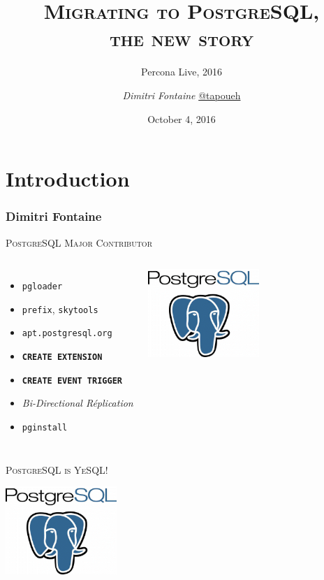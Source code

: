 \documentclass{beamer}
\title{\textsc{Migrating to PostgreSQL, \\ the new story}}
\subtitle{Percona Live, 2016}
\author{\textit{Dimitri Fontaine} \url{@tapoueh}}
\date{October 4, 2016}
\begin{document}
\frame{\titlepage}

\section{Introduction}

\begin{frame}[fragile]
  \frametitle{Dimitri Fontaine}

  \begin{center}
    {\Large \textsc{PostgreSQL Major Contributor}}
  \end{center}

  \begin{columns}[c]

    \begin{itemize}
    \item \texttt{pgloader}
    \item \texttt{prefix}, \texttt{skytools}
    \item \texttt{apt.postgresql.org}
    \item \texttt{\textbf{CREATE EXTENSION}}
    \item \texttt{\textbf{CREATE EVENT TRIGGER}}
    \item \textit{Bi-Directional Réplication}
    \item \texttt{pginstall}
    \end{itemize}  

    \begin{center}
      \includegraphics[height=9em]{postgres-logo.png}
    \end{center}
  \end{columns}
\end{frame}

\begin{frame}
  \begin{center}
    \textsc{\Huge PostgreSQL is YeSQL!}
    \vfill

    \includegraphics[height=9em]{postgres-logo.png}
  \end{center}
\end{frame}
\end{document}

